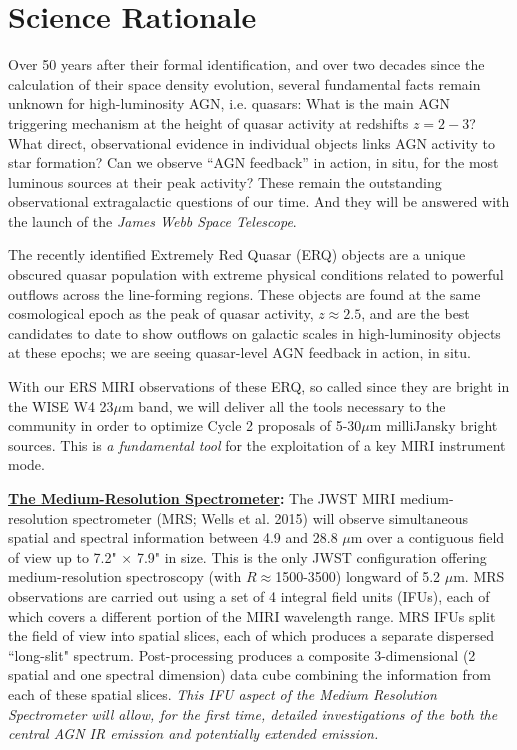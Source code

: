 \section*{Science Rationale}
\noindent
Over 50 years after their formal identification, and over two decades
since the calculation of their space density evolution, several
fundamental facts remain unknown for high-luminosity AGN,
i.e. quasars: What is the main AGN triggering mechanism at the height
of quasar activity at redshifts $z=2-3$? What direct,
observational evidence in individual objects links AGN activity
to star formation?  Can we observe ``AGN feedback'' in action, in situ,  
for the most luminous sources at their peak activity? These remain the
outstanding observational extragalactic questions of our time. And
they will be answered with the launch of the {\it James Webb Space
Telescope}.

\smallskip \smallskip
\noindent
The recently identified Extremely Red Quasar (ERQ) objects are a
unique obscured quasar population with extreme physical conditions
related to powerful outflows across the line-forming regions. These
objects are found at the same cosmological epoch as the peak of quasar
activity, $z\approx2.5$, and are the best candidates to date to show
outflows on galactic scales in high-luminosity objects at these epochs; 
we are seeing quasar-level AGN feedback in action, in situ.

\smallskip \smallskip
\noindent
With our ERS MIRI observations of these ERQ, so called since they are
bright in the WISE W4 23$\mu$m band, we will deliver all the tools
necessary to the community in order to optimize Cycle 2 proposals of
5-30$\mu$m milliJansky bright sources. This is {\it a fundamental
tool} for the exploitation of a key MIRI instrument mode.

\smallskip \smallskip
\noindent
{\bf \underline{The Medium-Resolution Spectrometer}:}
The JWST MIRI medium-resolution spectrometer (MRS; Wells et al. 2015)
will observe simultaneous spatial and spectral information between 4.9
and 28.8 $\mu$m over a contiguous field of view up to 7.2" × 7.9" in
size. This is the only JWST configuration offering medium-resolution
spectroscopy (with $R\approx$1500-3500) longward of 5.2 $\mu$m. 
MRS observations are carried out using a set of 4 integral field units
(IFUs), each of which covers a different portion of the MIRI
wavelength range. MRS IFUs split the field of view into spatial
slices, each of which produces a separate dispersed ``long-slit"
spectrum. Post-processing produces a composite 3-dimensional (2
spatial and one spectral dimension) data cube combining the
information from each of these spatial slices. {\it This IFU aspect of
the Medium Resolution Spectrometer will allow, for the first time,
detailed investigations of the both the central AGN IR emission and
potentially extended emission.}



